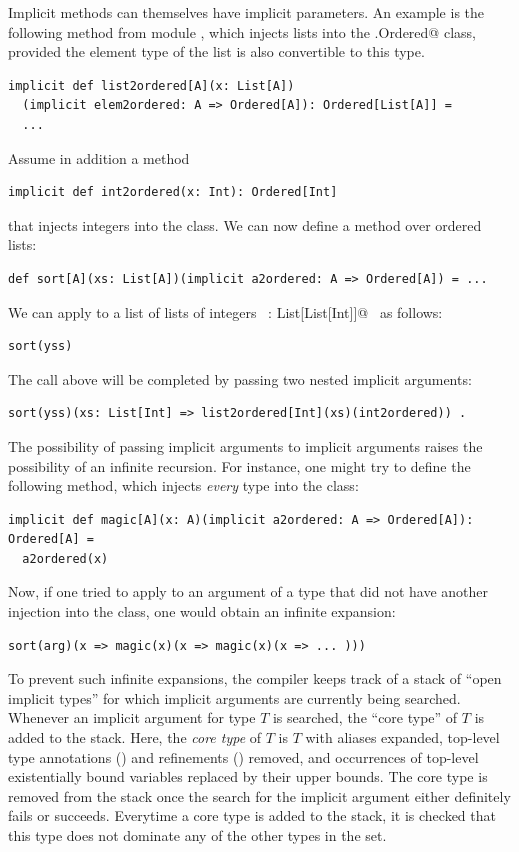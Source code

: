 Implicit methods can themselves have implicit parameters. An example
is the following method from module , which injects
lists into the \lstinline@scala.Ordered@ class, provided the element
type of the list is also convertible to this type.
\begin{lstlisting}
implicit def list2ordered[A](x: List[A])
  (implicit elem2ordered: A => Ordered[A]): Ordered[List[A]] = 
  ...
\end{lstlisting}
Assume in addition a method
\begin{lstlisting}
implicit def int2ordered(x: Int): Ordered[Int]
\end{lstlisting}
that injects integers into the \lstinline@Ordered@ class.  We can now
define a  method over ordered lists:
\begin{lstlisting}
def sort[A](xs: List[A])(implicit a2ordered: A => Ordered[A]) = ...
\end{lstlisting}
We can apply  to a list of lists of integers ~\lstinline@yss: List[List[Int]]@~ 
as follows:
\begin{lstlisting}
sort(yss)
\end{lstlisting}
The call above will be completed by passing two nested implicit arguments:
\begin{lstlisting}
sort(yss)(xs: List[Int] => list2ordered[Int](xs)(int2ordered)) .
\end{lstlisting}
The possibility of passing implicit arguments to implicit arguments
raises the possibility of an infinite recursion.  For instance, one
might try to define the following method, which injects {\em every} type into the \lstinline@Ordered@ class:
\begin{lstlisting}
implicit def magic[A](x: A)(implicit a2ordered: A => Ordered[A]): Ordered[A] = 
  a2ordered(x)
\end{lstlisting}
Now, if one tried to apply
\lstinline@sort@ to an argument  of a type that did not have
another injection into the  class, one would obtain an infinite
expansion:
\begin{lstlisting}
sort(arg)(x => magic(x)(x => magic(x)(x => ... )))
\end{lstlisting}
To prevent such infinite expansions, the compiler keeps track of 
a stack of ``open implicit types'' for which implicit arguments are currently being
searched. Whenever an implicit argument for type $T$ is searched, the
``core type'' of $T$ is added to the stack. Here, the {\em core type}
of $T$ is $T$ with aliases expanded, top-level type annotations () and
refinements () removed, and occurrences
of top-level existentially bound variables replaced by their upper
bounds. The core type is removed from the stack once the search for
the implicit argument either definitely fails or succeeds. Everytime a
core type is added to the stack, it is checked that this type does not
dominate any of the other types in the set.

